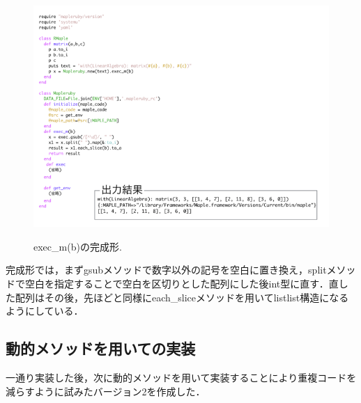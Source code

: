 \documentclass[10pt,a4j]{article}
\begin{document}
\begin{figure}[htbp]\begin{center}
\includegraphics[width=12cm,bb= 0 0 937 753]{../figs/./mapleruby_eringi.005.png}
\caption{exec\_m(b)の完成形.}
\label{figure:three}
\label{default}\end{center}\end{figure}
完成形では，まずgsubメソッドで数字以外の記号を空白に置き換え，splitメソッドで空白を指定することで空白を区切りとした配列にした後int型に直す．直した配列はその後，先ほどと同様にeach\_sliceメソッドを用いてlistlist構造になるようにしている．
\newpage

\subsection{動的メソッドを用いての実装}
一通り実装した後，次に動的メソッドを用いて実装することにより重複コードを減らすように試みたバージョン2を作成した．
\end{document}
